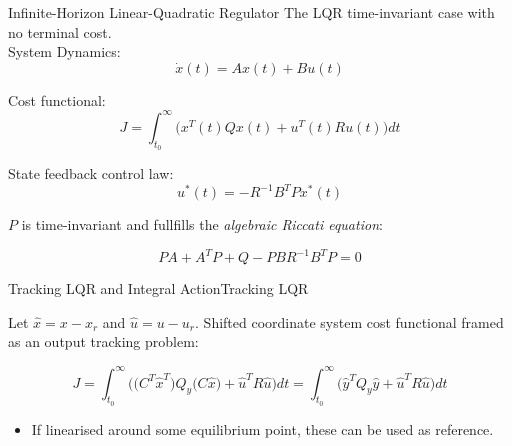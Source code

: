 \begin{frame}{Infinite-Horizon Linear-Quadratic Regulator}
	The LQR time-invariant case with no terminal cost.\\
	System Dynamics:
	\begin{equation}
		\dot{x}(t) = Ax(t) + Bu(t) \label{eq:TimeInvariantLinearSystem}
	\end{equation}

	Cost functional:		
	\begin{equation}\label{eq:LagrangeProblem}
		J = \int_{t_0}^{\infty} \big(x^T(t)Qx(t) + u^T(t)Ru(t)\big)dt
	\end{equation} 

	State feedback control law:
	\begin{equation}\label{eq:InfLQRFeedbackLaw}
		u^*(t) = -R^{-1}B^TPx^*(t)
	\end{equation}
	
	$P$ is time-invariant and fullfills the \textit{algebraic Riccati equation}:
	
	\begin{equation}\label{eq:ARE}
		PA + A^TP + Q - PBR^{-1}B^TP = 0
	\end{equation}
\end{frame}

\begin{frame}{Tracking LQR and Integral Action}{Tracking LQR}
	 
	
	Let $\hat{x} = x-x_r$ and $\hat{u} = u-u_r$. Shifted coordinate system cost functional framed as an output tracking problem:
		
	
	\begin{equation}\label{eq:LagrangeProblemOutput}
		J = \int_{t_0}^{\infty} \big( \big(C^T\hat{x}^T\big) Q_y \big(C\hat{x}\big) + \hat{u}^TR\hat{u} \big) dt = \int_{t_0}^{\infty} \big(\hat{y}^TQ_y\hat{y} + \hat{u}^TR\hat{u}\big)dt
	\end{equation} 
	
	\begin{itemize}
		\item If linearised around some equilibrium point, these can be used as reference.
	\end{itemize}

\end{frame}


